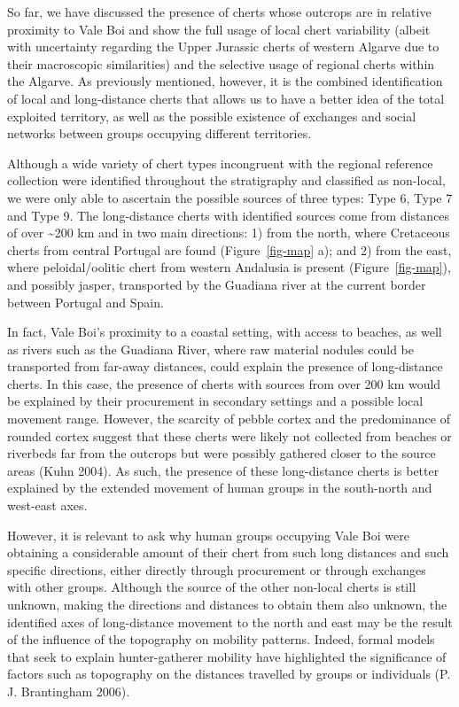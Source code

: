 \documentclass[
  a4paper,
  DIV=11,
  numbers=noendperiod]{scrreprt}
\begin{document}
So far, we have discussed the presence of cherts whose outcrops are in
relative proximity to Vale Boi and show the full usage of local chert
variability (albeit with uncertainty regarding the Upper Jurassic cherts
of western Algarve due to their macroscopic similarities) and the
selective usage of regional cherts within the Algarve. As previously
mentioned, however, it is the combined identification of local and
long-distance cherts that allows us to have a better idea of the total
exploited territory, as well as the possible existence of exchanges and
social networks between groups occupying different territories.

Although a wide variety of chert types incongruent with the regional
reference collection were identified throughout the stratigraphy and
classified as non-local, we were only able to ascertain the possible
sources of three types: Type 6, Type 7 and Type 9. The long-distance
cherts with identified sources come from distances of over
\textasciitilde200 km and in two main directions: 1) from the north,
where Cretaceous cherts from central Portugal are found
(Figure~\ref{fig-map} a); and 2) from the east, where peloidal/oolitic
chert from western Andalusia is present (Figure~\ref{fig-map}), and
possibly jasper, transported by the Guadiana river at the current border
between Portugal and Spain.

In fact, Vale Boi's proximity to a coastal setting, with access to
beaches, as well as rivers such as the Guadiana River, where raw
material nodules could be transported from far-away distances, could
explain the presence of long-distance cherts. In this case, the presence
of cherts with sources from over 200 km would be explained by their
procurement in secondary settings and a possible local movement range.
However, the scarcity of pebble cortex and the predominance of rounded
cortex suggest that these cherts were likely not collected from beaches
or riverbeds far from the outcrops but were possibly gathered closer to
the source areas (Kuhn 2004). As such, the presence of these
long-distance cherts is better explained by the extended movement of
human groups in the south-north and west-east axes.

However, it is relevant to ask why human groups occupying Vale Boi were
obtaining a considerable amount of their chert from such long distances
and such specific directions, either directly through procurement or
through exchanges with other groups. Although the source of the other
non-local cherts is still unknown, making the directions and distances
to obtain them also unknown, the identified axes of long-distance
movement to the north and east may be the result of the influence of the
topography on mobility patterns. Indeed, formal models that seek to
explain hunter-gatherer mobility have highlighted the significance of
factors such as topography on the distances travelled by groups or
individuals (P. J. Brantingham 2006).
\end{document}
